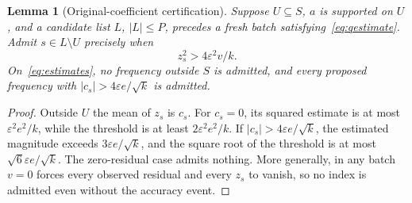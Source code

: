 \documentclass[11pt]{article}
\newtheorem{lemma}[theorem]{Lemma}
\theoremstyle{remark}\newtheorem{remark}[theorem]{Remark}
\begin{document}
\begin{lemma}[Original-coefficient certification]\label{lem:certificate}
Suppose $U\subseteq S$, $a$ is supported on $U$, and a candidate list $L$, $|L|\le P$, precedes a fresh batch satisfying~\eqref{eq:qestimate}. Admit $s\in L\setminus U$ precisely when
\begin{equation}\label{eq:certificate}
 z_s^2>4\varepsilon^2v/k.
\end{equation}
On~\eqref{eq:estimates}, no frequency outside $S$ is admitted, and every proposed frequency with $|c_s|>4\varepsilon e/\sqrt k$ is admitted.
\end{lemma}
\begin{proof}
Outside $U$ the mean of $z_s$ is $c_s$. For $c_s=0$, its squared estimate is at most $\varepsilon^2e^2/k$, while the threshold is at least $2\varepsilon^2e^2/k$. If $|c_s|>4\varepsilon e/\sqrt k$, the estimated magnitude exceeds $3\varepsilon e/\sqrt k$, and the square root of the threshold is at most $\sqrt6\varepsilon e/\sqrt k$. The zero-residual case admits nothing. More generally, in any batch $v=0$ forces every observed residual and every $z_s$ to vanish, so no index is admitted even without the accuracy event.
\end{proof}
\end{document}
